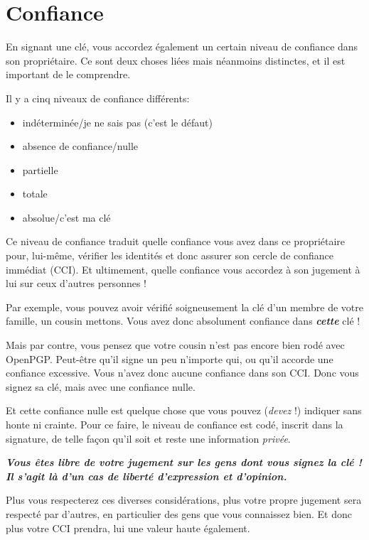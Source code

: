\section{Confiance}\label{confiance}

En signant une clé, vous accordez également un certain niveau de
confiance dans son propriétaire. Ce sont deux choses liées mais néanmoins distinctes, et il est important
de le comprendre.

Il y a cinq niveaux de confiance différents:

\begin{itemize}
\itemsep1pt\parskip0pt
\item
  indéterminée/je ne sais pas (c'est le défaut)
\item
  absence de confiance/nulle
\item
  partielle
\item
  totale
\item
  absolue/c'est ma clé
\end{itemize}

Ce niveau de confiance traduit quelle confiance vous avez dans ce
propriétaire pour, lui-même, vérifier les identités et donc assurer son
cercle de confiance immédiat (CCI). Et ultimement, quelle confiance vous
accordez à son jugement à lui sur ceux d'autres personnes !

Par exemple, vous pouvez avoir vérifié soigneusement la clé d'un membre
de votre famille, un cousin mettons. Vous avez donc absolument confiance
dans \textbf{\emph{cette}} clé !

Mais par contre, vous pensez que votre cousin n'est pas encore bien rodé avec OpenPGP. Peut-être qu'il signe un peu n'importe qui, ou qu'il
accorde une confiance excessive. Vous n'avez donc aucune confiance dans son CCI. Donc vous signez sa clé, mais avec une confiance nulle.

Et cette confiance nulle est quelque chose que vous pouvez (\emph{devez}
!) indiquer sans honte ni crainte. Pour ce faire, le niveau de confiance
est codé, inscrit dans la signature, de telle façon qu'il soit et reste
une information \emph{privée}.

\textbf{\emph{Vous êtes libre de votre jugement sur les gens dont vous
signez la clé ! Il s'agit là d'un cas de liberté d'expression et
d'opinion.}}

Plus vous respecterez ces diverses considérations, plus votre propre
jugement sera respecté par d'autres, en particulier des gens que vous
connaissez bien. Et donc plus votre CCI prendra, lui une valeur haute également.

